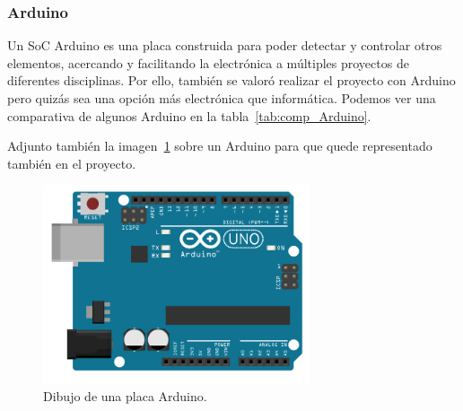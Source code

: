 \subsubsection{Arduino}\label{4:Arduino}

Un SoC Arduino es una placa construida para poder detectar y controlar otros elementos, acercando y facilitando la electrónica a múltiples proyectos de diferentes disciplinas. Por ello, también se valoró realizar el proyecto con Arduino pero quizás sea una opción más electrónica que informática.
Podemos ver una comparativa de algunos Arduino en la tabla~\ref{tab:comp_Arduino}.

Adjunto también la imagen~\ref{Img:Arduino} sobre un Arduino para que quede representado también en el proyecto.

\begin{figure}
    \centering
    \includegraphics[width=0.7\textwidth]{img/Diagramas/arduinoUno.PNG}
    \caption{Dibujo de una placa Arduino.} \label{Img:Arduino}
\end{figure}



